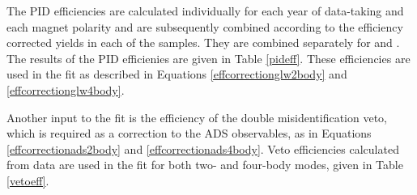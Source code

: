 The PID efficiencies are calculated individually for each year of data-taking and each magnet polarity and are subsequently combined according to the efficiency corrected yields in each of the samples. They are combined separately for \runone and \runtwo. The results of the PID efficienies are given in Table \ref{pideff}. These efficiencies are used in the \CP fit as described in Equations \ref{effcorrectionglw2body} and \ref{effcorrectionglw4body}. 

\begin{table}[h]
\centering
{}
\caption{Summary of the PID efficiencies used in the \CP fit.}
\label{pideff}
\end{table}

Another input to the fit is the efficiency of the double misidentification veto, which is required as a correction to the ADS observables, as in Equations \ref{effcorrectionads2body} and \ref{effcorrectionads4body}. Veto efficiencies calculated from data are used in the \CP fit for both two- and four-body modes, given in Table \ref{vetoeff}.

\begin{table}[h]
\centering
{}
\caption{Summary of the veto efficiencies used in the \CP fit.}
\label{vetoeff}
\end{table}

